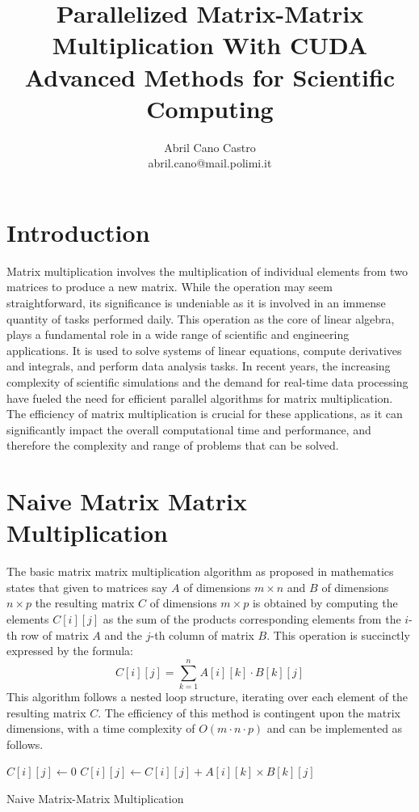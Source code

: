 \documentclass[12p,english]{article}
\title{\textbf{Parallelized Matrix-Matrix \\\medskip Multiplication With CUDA}\\
Advanced Methods for Scientific Computing }
\author{Abril Cano Castro \\ abril.cano@mail.polimi.it}
\date{}
\begin{document}
\maketitle

\section{Introduction}

Matrix multiplication involves the multiplication of individual elements from two matrices to produce a new matrix. While the operation may seem straightforward, its significance is undeniable as it is involved in an immense quantity of tasks performed daily. 
This operation as the core of linear algebra, plays a fundamental role in a wide range of scientific and engineering applications. It is used to solve systems of linear equations, compute derivatives and integrals, and perform data analysis tasks. In recent years, the increasing complexity of scientific simulations and the demand for real-time data processing have fueled the need for efficient parallel algorithms for matrix multiplication. The efficiency of matrix multiplication is crucial for these applications, as it can significantly impact the overall computational time and performance, and therefore the complexity and range of problems that can be solved. 


\section{Naive Matrix Matrix Multiplication}

The basic matrix matrix multiplication algorithm as proposed in mathematics states that given to matrices say $A$ of dimensions $m \times n$ and $B$ of dimensions $n \times p $ the resulting matrix $C$ of dimensions $m \times p$ is obtained by computing the elements $C[i][j]$ as the sum of the products corresponding elements from the $i$-th row of matrix $A$ and the $j$-th column of matrix $B$. This operation is succinctly expressed by the formula:\[ C[i][j] = \sum_{k=1}^{n} A[i][k] \cdot B[k][j] \]
This algorithm follows a nested loop structure, iterating over each element of the resulting matrix $C$. The efficiency of this method is contingent upon the matrix dimensions, with a time complexity of $O(m \cdot n \cdot p)$ and can be implemented as follows. 

\begin{algorithm}
\begin{algorithmic}[1]
            \State $C[i][j] \gets 0$ 
                \State $C[i][j] \gets C[i][j] + A[i][k] \times B[k][j]$
            \EndFor
        \EndFor
    \EndFor
\EndProcedure
\end{algorithmic}

\caption{{Naive Matrix-Matrix Multiplication}}
\end{algorithm}
\end{document}
